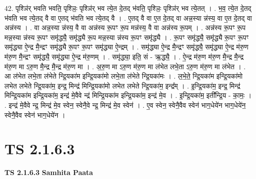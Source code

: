 \documentclass[17pt]{extarticle}
\begin{document}
42. पृश्ञि॑र् भवति भवति॒ पृश्ञिः॒ पृश्ञि॑र् भव त्ये॒त दे॒तद् भ॑वति॒ पृश्ञिः॒ पृश्ञि॑र् भव त्ये॒तत् । . भ॒व॒ त्ये॒त दे॒तद् भ॑वति भव त्ये॒तद् वै वा ए॒तद् भ॑वति भव त्ये॒तद् वै । . ए॒तद् वै वा ए॒त दे॒तद् वा अन्न॒स्या न्न॑स्य॒ वा ए॒त दे॒तद् वा अन्न॑स्य । . वा अन्न॒स्या न्न॑स्य॒ वै वा अन्न॑स्य रू॒पꣳ रू॒प मन्न॑स्य॒ वै वा अन्न॑स्य रू॒पम् । . अन्न॑स्य रू॒पꣳ रू॒प मन्न॒स्या न्न॑स्य रू॒पꣳ समृ॑द्ध्यै॒ समृ॑द्ध्यै रू॒प मन्न॒स्या न्न॑स्य रू॒पꣳ समृ॑द्ध्यै । . रू॒पꣳ समृ॑द्ध्यै॒ समृ॑द्ध्यै रू॒पꣳ रू॒पꣳ समृ॑द्ध्या ऐ॒न्द्र मै॒न्द्रꣳ समृ॑द्ध्यै रू॒पꣳ रू॒पꣳ समृ॑द्ध्या ऐ॒न्द्रम् । . समृ॑द्ध्या ऐ॒न्द्र मै॒न्द्रꣳ समृ॑द्ध्यै॒ समृ॑द्ध्या ऐ॒न्द्र म॑रु॒ण म॑रु॒ण मै॒न्द्रꣳ समृ॑द्ध्यै॒ समृ॑द्ध्या ऐ॒न्द्र म॑रु॒णम् । . समृ॑द्ध्या॒ इति॒ सं - ऋ॒द्ध्यै॒ । . ऐ॒न्द्र म॑रु॒ण म॑रु॒ण मै॒न्द्र मै॒न्द्र म॑रु॒ण मा ऽरु॒ण मै॒न्द्र मै॒न्द्र म॑रु॒ण मा । . अ॒रु॒ण मा ऽरु॒ण म॑रु॒ण मा ल॑भेत लभे॒ता ऽरु॒ण म॑रु॒ण मा ल॑भेत । . आ ल॑भेत लभे॒ता ल॑भेते न्द्रि॒यका॑म इन्द्रि॒यका॑मो लभे॒ता ल॑भेते न्द्रि॒यका॑मः । . ल॒भे॒ते॒ न्द्रि॒यका॑म इन्द्रि॒यका॑मो लभेत लभेते न्द्रि॒यका॑म॒ इन्द्र॒ मिन्द्र॑ मिन्द्रि॒यका॑मो लभेत लभेते न्द्रि॒यका॑म॒ इन्द्र᳚म् । . इ॒न्द्रि॒यका॑म॒ इन्द्र॒ मिन्द्र॑ मिन्द्रि॒यका॑म इन्द्रि॒यका॑म॒ इन्द्र॑ मे॒वैवे न्द्र॑ मिन्द्रि॒यका॑म इन्द्रि॒यका॑म॒ इन्द्र॑ मे॒व । . इ॒न्द्रि॒यका॑म॒ इती᳚न्द्रि॒य - का॒मः॒ । . इन्द्र॑ मे॒वैवे न्द्र॒ मिन्द्र॑ मे॒व स्वेन॒ स्वेनै॒वे न्द्र॒ मिन्द्र॑ मे॒व स्वेन॑ । . ए॒व स्वेन॒ स्वेनै॒वैव स्वेन॑ भाग॒धेये॑न भाग॒धेये॑न॒ स्वेनै॒वैव स्वेन॑ भाग॒धेये॑न । \newline
\pagebreak
{}

\section{ TS 2.1.6.3 }

\textbf{TS 2.1.6.3 } \newline
\textbf{Samhita Paata} \newline
\end{document}

